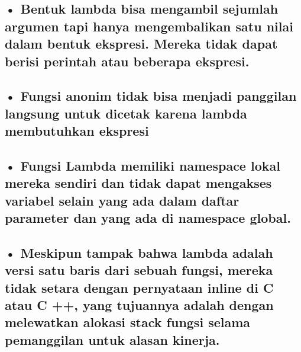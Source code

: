 \documentclass[a4paper,12pt]{report}
\begin{document}
\subsection*{ \hspace{10pt} • Bentuk lambda bisa mengambil sejumlah argumen tapi hanya mengembalikan satu nilai  \hspace{10pt}    dalam bentuk ekspresi. Mereka tidak dapat berisi perintah atau beberapa ekspresi.}
 \par
\subsection*{ \hspace{10pt} • Fungsi anonim tidak bisa menjadi panggilan langsung untuk dicetak karena lambda  \hspace{10pt}    membutuhkan ekspresi}
 \par
\subsection*{ \hspace{10pt} • Fungsi Lambda memiliki namespace lokal mereka sendiri dan tidak dapat mengakses  \hspace{10pt}   variabel selain yang ada dalam daftar parameter dan yang ada di namespace global.}
 \par
\begin{adjustwidth}{0.44in}{0.03in}
\subsection*{ \hspace{10pt} • Meskipun tampak bahwa lambda adalah versi satu baris dari sebuah fungsi, mereka tidak  \hspace{10pt}   setara dengan pernyataan inline di C atau C ++, yang tujuannya adalah dengan  \hspace{10pt}         melewatkan alokasi stack fungsi selama pemanggilan untuk alasan kinerja.}
\end{adjustwidth}
 \par
\vspace{12pt}
\end{document}
